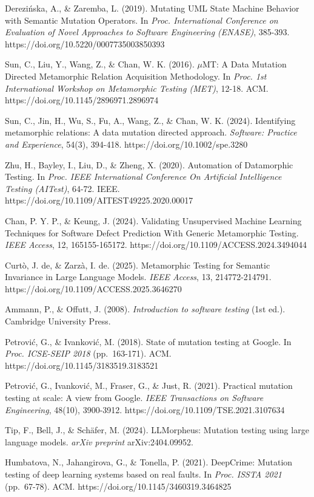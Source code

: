 \documentclass[review,12pt,authoryear]{elsarticle}
\begin{document}
Derezińska, A., \& Zaremba, L. (2019). Mutating UML State Machine
Behavior with Semantic Mutation Operators. In \emph{Proc. International
Conference on Evaluation of Novel Approaches to Software Engineering
(ENASE)}, 385-393. https://doi.org/10.5220/0007735003850393

Sun, C., Liu, Y., Wang, Z., \& Chan, W. K. (2016). $\mu$MT: A Data Mutation
Directed Metamorphic Relation Acquisition Methodology. In \emph{Proc.
1st International Workshop on Metamorphic Testing (MET)}, 12-18. ACM.
https://doi.org/10.1145/2896971.2896974

Sun, C., Jin, H., Wu, S., Fu, A., Wang, Z., \& Chan, W. K. (2024).
Identifying metamorphic relations: A data mutation directed approach.
\emph{Software: Practice and Experience}, 54(3), 394-418.
https://doi.org/10.1002/spe.3280

Zhu, H., Bayley, I., Liu, D., \& Zheng, X. (2020). Automation of
Datamorphic Testing. In \emph{Proc. IEEE International Conference On
Artificial Intelligence Testing (AITest)}, 64-72. IEEE.
https://doi.org/10.1109/AITEST49225.2020.00017

Chan, P. Y. P., \& Keung, J. (2024). Validating Unsupervised Machine
Learning Techniques for Software Defect Prediction With Generic
Metamorphic Testing. \emph{IEEE Access}, 12, 165155-165172.
https://doi.org/10.1109/ACCESS.2024.3494044

Curtò, J. de, \& Zarzà, I. de. (2025). Metamorphic Testing for Semantic
Invariance in Large Language Models. \emph{IEEE Access}, 13,
214772-214791. https://doi.org/10.1109/ACCESS.2025.3646270

Ammann, P., \& Offutt, J. (2008). \emph{Introduction to software
testing} (1st ed.). Cambridge University Press.

Petrović, G., \& Ivanković, M. (2018). State of mutation testing at
Google. In \emph{Proc. ICSE-SEIP 2018} (pp.~163-171). ACM.
https://doi.org/10.1145/3183519.3183521

Petrović, G., Ivanković, M., Fraser, G., \& Just, R. (2021). Practical
mutation testing at scale: A view from Google. \emph{IEEE Transactions
on Software Engineering}, 48(10), 3900-3912.
https://doi.org/10.1109/TSE.2021.3107634

Tip, F., Bell, J., \& Schäfer, M. (2024). LLMorpheus: Mutation testing
using large language models. \emph{arXiv preprint} arXiv:2404.09952.

Humbatova, N., Jahangirova, G., \& Tonella, P. (2021). DeepCrime:
Mutation testing of deep learning systems based on real faults. In
\emph{Proc. ISSTA 2021} (pp.~67-78). ACM.
https://doi.org/10.1145/3460319.3464825
\end{document}
